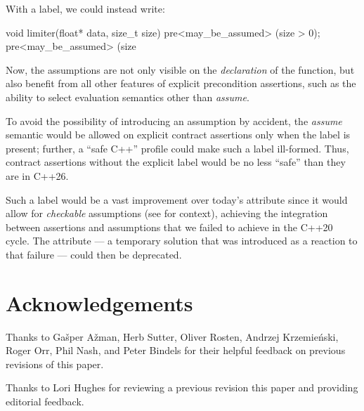 {With a  label, we could instead write:
\begin{codeblock}
void limiter(float* data, size_t size)
  pre<may_be_assumed> (size > 0);
  pre<may_be_assumed> (size %
\end{codeblock}
Now, the assumptions are not only visible on the \emph{declaration} of the function, but also benefit from all other features of explicit precondition assertions, such as the ability to select evaluation semantics other than \emph{assume}.

To avoid the possibility of introducing an assumption by accident, the \emph{assume} semantic would be allowed on explicit contract assertions only when the \mbox{} label is present; further, a ``safe C++'' profile could make such a label ill-formed. Thus, contract assertions without the explicit label would be no less ``safe'' than they are in C++26.

Such a label would be a vast improvement over today's \tcode{[[assume]]} attribute since it would allow for \emph{checkable} assumptions (see \cite{P2064R0} for context), achieving the integration between assertions and assumptions that we failed to achieve in the C++20 cycle. The \tcode{[[assume]]} attribute --- a temporary solution that was introduced as a reaction to that failure --- could then be deprecated.


\section*{Acknowledgements}

Thanks to Ga\v{s}per A\v{z}man, Herb Sutter, Oliver Rosten, Andrzej Krzemie{\'n}ski, Roger Orr, Phil Nash, and Peter Bindels for their helpful feedback on previous revisions of this paper.

Thanks to Lori Hughes for reviewing a previous revision this paper and providing editorial feedback. 


\renewcommand{\bibname}{References}  %
\nobibintoc  %



}
